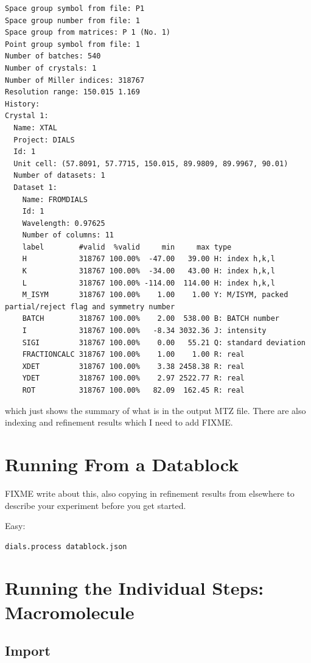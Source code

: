 \documentclass[a4paper, 11pt]{article}
\begin{document}
{\small
\begin{verbatim}
Space group symbol from file: P1
Space group number from file: 1
Space group from matrices: P 1 (No. 1)
Point group symbol from file: 1
Number of batches: 540
Number of crystals: 1
Number of Miller indices: 318767
Resolution range: 150.015 1.169
History:
Crystal 1:
  Name: XTAL
  Project: DIALS
  Id: 1
  Unit cell: (57.8091, 57.7715, 150.015, 89.9809, 89.9967, 90.01)
  Number of datasets: 1
  Dataset 1:
    Name: FROMDIALS
    Id: 1
    Wavelength: 0.97625
    Number of columns: 11
    label        #valid  %valid     min     max type
    H            318767 100.00%  -47.00   39.00 H: index h,k,l
    K            318767 100.00%  -34.00   43.00 H: index h,k,l
    L            318767 100.00% -114.00  114.00 H: index h,k,l
    M_ISYM       318767 100.00%    1.00    1.00 Y: M/ISYM, packed partial/reject flag and symmetry number
    BATCH        318767 100.00%    2.00  538.00 B: BATCH number
    I            318767 100.00%   -8.34 3032.36 J: intensity
    SIGI         318767 100.00%    0.00   55.21 Q: standard deviation
    FRACTIONCALC 318767 100.00%    1.00    1.00 R: real
    XDET         318767 100.00%    3.38 2458.38 R: real
    YDET         318767 100.00%    2.97 2522.77 R: real
    ROT          318767 100.00%   82.09  162.45 R: real
\end{verbatim}
}

\noindent
which just shows the summary of what is in the output MTZ file. There are also indexing and refinement results which I need to add FIXME.

\section{Running From a Datablock}

FIXME write about this, also copying in refinement results from
elsewhere to describe your experiment before you get started.

Easy:

{\small
\begin{verbatim}
dials.process datablock.json
\end{verbatim}
}

\section{Running the Individual Steps: Macromolecule}

\subsection{Import}
\end{document}
